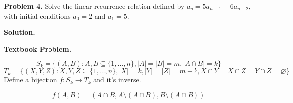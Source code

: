 \textbf{Problem 4.} Solve the linear recurrence relation defined by
$ a_n=5a_{n-1}-6a_{n-2} $, with initial conditions $ a_0=2 $
and $ a_1=5 $.

\textbf{Solution.}

\textbf{Textbook Problem.}

\[ S_k=\{(A,B): A,B\subseteq \{1,\ldots ,n\},|A|=|B|=m,|A\cap B|=k\} \]
\[ T_k=\{(X,Y,Z):X,Y,Z\subseteq \{1,\ldots ,n\},|X|=k,|Y|=|Z|=m-k,
X\cap Y=X\cap Z=Y\cap Z=\varnothing\} \]
Define a bijection $ f:S_k\rightarrow T_k $ and it's inverse.

\[ f(A,B)=(A\cap B, A\setminus (A\cap B), B\setminus (A\cap B)) \]
